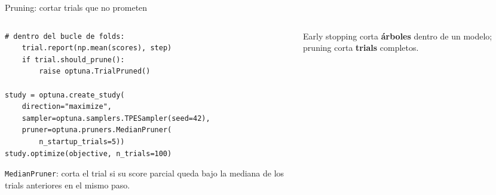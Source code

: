 \documentclass[aspectratio=169,12pt]{beamer}
\begin{document}
\begin{frame}[fragile]{Pruning: cortar trials que no prometen}
  \begin{columns}[T]
    \begin{column}{0.52\textwidth}
\begin{lstlisting}[basicstyle=\ttfamily\scriptsize,columns=fullflexible,keepspaces=true,numbers=none]
    # dentro del bucle de folds:
    trial.report(np.mean(scores), step)
    if trial.should_prune():
        raise optuna.TrialPruned()

study = optuna.create_study(
    direction="maximize",
    sampler=optuna.samplers.TPESampler(seed=42),
    pruner=optuna.pruners.MedianPruner(
        n_startup_trials=5))
study.optimize(objective, n_trials=100)
\end{lstlisting}
      \footnotesize \texttt{MedianPruner}: corta el trial si su score parcial queda bajo la mediana de los trials anteriores en el mismo paso.
    \end{column}
    \begin{column}{0.44\textwidth}
      \centering
      \par\footnotesize Early stopping corta \textbf{árboles} dentro de un modelo; pruning corta \textbf{trials} completos.
    \end{column}
  \end{columns}
\end{frame}
\end{document}
